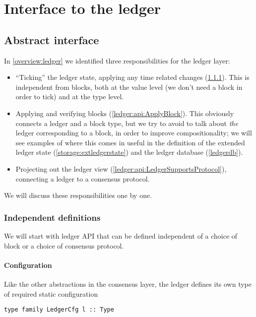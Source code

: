 \chapter{Interface to the ledger}
\label{ledger}

\section{Abstract interface}
\label{ledger:api}

In \cref{overview:ledger} we identified three responsibilities for the ledger
layer:
%
\begin{itemize}
\item ``Ticking'' the ledger state, applying any time related changes
(\cref{ledger:api:IsLedger}). This is independent from blocks, both at the value
level (we don't need a block in order to tick) and at the type level.
\item Applying and verifying blocks (\cref{ledger:api:ApplyBlock}). This
obviously connects a ledger and a block type, but we try to avoid to talk about
\emph{the} ledger corresponding to a block, in order to improve
compositionality; we will see examples of where this comes in useful in the
definition of the extended ledger state (\cref{storage:extledgerstate}) and the
ledger database (\cref{ledgerdb}).
\item Projecting out the ledger view (\cref{ledger:api:LedgerSupportsProtocol}),
connecting a ledger to a consensus protocol.
\end{itemize}
%
We will discuss these responsibilities one by one.

\subsection{Independent definitions}
\label{ledger:api:IsLedger}

We will start with ledger API that can be defined independent of a choice of
block or a choice of consensus protocol.

\subsubsection{Configuration}

Like the other abstractions in the consensus layer, the ledger defines its own
type of required static configuration
%
\begin{lstlisting}
type family LedgerCfg l :: Type
\end{lstlisting}

